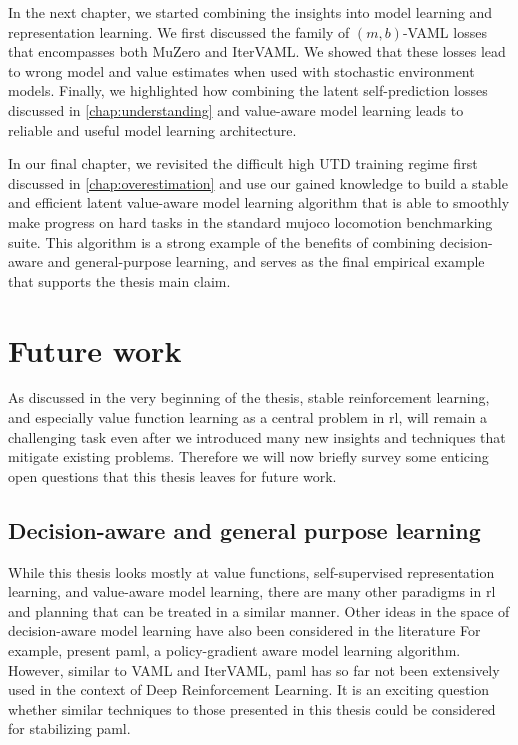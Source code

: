 In the next chapter, we started combining the insights into model learning and representation learning.
We first discussed the family of $(m,b)$-VAML losses that encompasses both MuZero and IterVAML.
We showed that these losses lead to wrong model and value estimates when used with stochastic environment models.
Finally, we highlighted how combining the latent self-prediction losses discussed in \autoref{chap:understanding} and value-aware model learning leads to reliable and useful model learning architecture.

In our final chapter, we revisited the difficult high UTD training regime first discussed in \autoref{chap:overestimation} and use our gained knowledge to build a stable and efficient latent value-aware model learning algorithm that is able to smoothly make progress on hard tasks in the standard mujoco locomotion benchmarking suite.
This algorithm is a strong example of the benefits of combining decision-aware and general-purpose learning, and serves as the final empirical example that supports the thesis main claim.


\section{Future work}


As discussed in the very beginning of the thesis, stable reinforcement learning, and especially value function learning as a central problem in \ac{rl}, will remain a challenging task even after we introduced many new insights and techniques that mitigate existing problems.
Therefore we will now briefly survey some enticing open questions that this thesis leaves for future work.

\subsection{Decision-aware and general purpose learning}

While this thesis looks mostly at value functions, self-supervised representation learning, and value-aware model learning, there are many other paradigms in \ac{rl} and planning that can be treated in a similar manner.
Other ideas in the space of decision-aware model learning have also been considered in the literature
For example, \textcite{abachi2020policy} present \ac{paml}, a policy-gradient aware model learning algorithm.
However, similar to VAML and IterVAML, \ac{paml} has so far not been extensively used in the context of Deep Reinforcement Learning.
It is an exciting question whether similar techniques to those presented in this thesis could be considered for stabilizing \ac{paml}.

